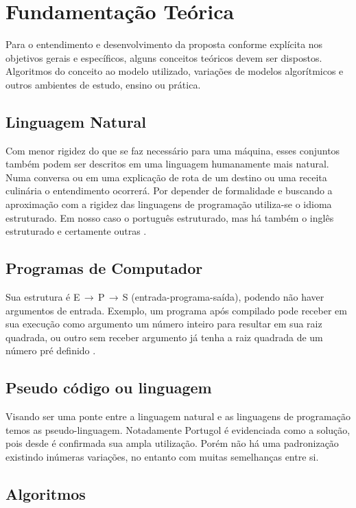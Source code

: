 \ifdraft{\color{green}}{}\chapter{Fundamentação Teórica}

Para o entendimento e desenvolvimento da proposta conforme explícita nos objetivos gerais e específicos, alguns conceitos teóricos devem ser dispostos. Algoritmos do conceito ao modelo utilizado, variações de modelos algorítmicos e outros ambientes de estudo, ensino ou prática.

\section{Linguagem Natural}

Com menor rigidez do que se faz necessário para uma máquina, esses conjuntos também podem ser descritos em uma linguagem humanamente mais natural. Numa conversa ou em uma explicação de rota de um destino ou uma receita culinária o entendimento ocorrerá. Por depender de formalidade e buscando a aproximação com a rigidez das linguagens de programação utiliza-se o idioma estruturado. Em nosso caso o português estruturado, mas há também o inglês estruturado e certamente outras \cite{medina2006etal}.

\section{Programas de Computador}

Sua estrutura é E$\,\to\,$P$\,\to\,$S (entrada-programa-saída), podendo não haver argumentos de entrada. Exemplo, um programa após compilado pode receber em sua execução como argumento um número inteiro para resultar em sua raiz quadrada, ou outro sem receber argumento já tenha a raiz quadrada de um número pré definido \cite{medina2006etal}.

\section{Pseudo código ou linguagem}

Visando ser uma ponte entre a linguagem natural e as linguagens de programação temos as pseudo-linguagem. Notadamente Portugol é evidenciada como a solução, pois desde  é confirmada sua ampla utilização. Porém não há uma padronização existindo inúmeras variações, no entanto com muitas semelhanças entre si.

\section{Algoritmos}


